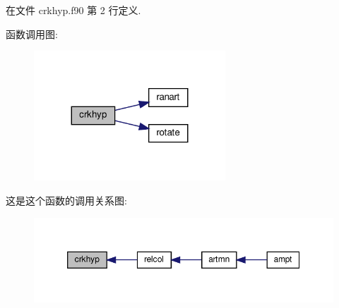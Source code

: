 在文件 crkhyp.\+f90 第 2 行定义.

函数调用图\+:
\nopagebreak
\begin{figure}[H]
\begin{center}
\leavevmode
\includegraphics[width=203pt]{crkhyp_8f90_a3cee9184ff3be381c1a195e301ef0ffa_cgraph}
\end{center}
\end{figure}
这是这个函数的调用关系图\+:
\nopagebreak
\begin{figure}[H]
\begin{center}
\leavevmode
\includegraphics[width=350pt]{crkhyp_8f90_a3cee9184ff3be381c1a195e301ef0ffa_icgraph}
\end{center}
\end{figure}
